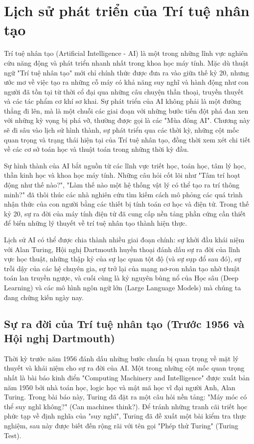 \section{Lịch sử phát triển của Trí tuệ nhân tạo}

Trí tuệ nhân tạo (Artificial Intelligence - AI) là một trong những lĩnh vực nghiên cứu năng động và phát triển nhanh nhất trong khoa học máy tính. Mặc dù thuật ngữ "Trí tuệ nhân tạo" mới chỉ chính thức được đưa ra vào giữa thế kỷ 20, nhưng ước mơ về việc tạo ra những cỗ máy có khả năng suy nghĩ và hành động như con người đã tồn tại từ thời cổ đại qua những câu chuyện thần thoại, truyền thuyết và các tác phẩm cơ khí sơ khai. Sự phát triển của AI không phải là một đường thẳng đi lên, mà là một chuỗi các giai đoạn với những bước tiến đột phá đan xen với những kỳ vọng bị phá vỡ, thường được gọi là các "Mùa đông AI". Chương này sẽ đi sâu vào lịch sử hình thành, sự phát triển qua các thời kỳ, những cột mốc quan trọng và trạng thái hiện tại của Trí tuệ nhân tạo, đồng thời xem xét chi tiết về các cơ sở toán học và thuật toán trong những thời kỳ đầu.

Sự hình thành của AI bắt nguồn từ các lĩnh vực triết học, toán học, tâm lý học, thần kinh học và khoa học máy tính. Những câu hỏi cốt lõi như "Tâm trí hoạt động như thế nào?", "Làm thế nào một hệ thống vật lý có thể tạo ra trí thông minh?" đã thôi thúc các nhà nghiên cứu tìm kiếm cách mô phỏng các quá trình nhận thức của con người bằng các thiết bị tính toán cơ học và điện tử. Trong thế kỷ 20, sự ra đời của máy tính điện tử đã cung cấp nền tảng phần cứng cần thiết để biến những lý thuyết về trí tuệ nhân tạo thành hiện thực. 

Lịch sử AI có thể được chia thành nhiều giai đoạn chính: sự khởi đầu khái niệm với Alan Turing, Hội nghị Dartmouth huyền thoại đánh dấu sự ra đời của lĩnh vực học thuật, những thập kỷ của sự lạc quan tột độ (và sự sụp đổ sau đó), sự trỗi dậy của các hệ chuyên gia, sự trở lại của mạng nơ-ron nhân tạo nhờ thuật toán lan truyền ngược, và cuối cùng là kỷ nguyên bùng nổ của Học sâu (Deep Learning) và các mô hình ngôn ngữ lớn (Large Language Models) mà chúng ta đang chứng kiến ngày nay.

\newpage

\subsection{Sự ra đời của Trí tuệ nhân tạo (Trước 1956 và Hội nghị Dartmouth)}

Thời kỳ trước năm 1956 đánh dấu những bước chuẩn bị quan trọng về mặt lý thuyết và khái niệm cho sự ra đời của AI. Một trong những cột mốc quan trọng nhất là bài báo kinh điển "Computing Machinery and Intelligence" được xuất bản năm 1950 bởi nhà toán học, logic học và mật mã học vĩ đại người Anh, Alan Turing. Trong bài báo này, Turing đã đặt ra một câu hỏi nền tảng: "Máy móc có thể suy nghĩ không?" (Can machines think?). Để tránh những tranh cãi triết học phức tạp về định nghĩa của "suy nghĩ", Turing đã đề xuất một bài kiểm tra thực nghiệm, sau này được biết đến rộng rãi với tên gọi "Phép thử Turing" (Turing Test).

